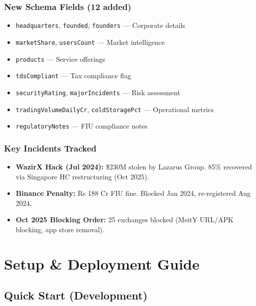 \documentclass[12pt,a4paper]{article}
\begin{document}
\subsubsection*{New Schema Fields (12 added)}
\begin{itemize}[nosep]
    \item \texttt{headquarters}, \texttt{founded}, \texttt{founders} — Corporate details
    \item \texttt{marketShare}, \texttt{usersCount} — Market intelligence
    \item \texttt{products} — Service offerings
    \item \texttt{tdsCompliant} — Tax compliance flag
    \item \texttt{securityRating}, \texttt{majorIncidents} — Risk assessment
    \item \texttt{tradingVolumeDailyCr}, \texttt{coldStoragePct} — Operational metrics
    \item \texttt{regulatoryNotes} — FIU compliance notes
\end{itemize}

\subsubsection*{Key Incidents Tracked}
\begin{itemize}[nosep]
    \item \textbf{WazirX Hack (Jul 2024):} \$230M stolen by Lazarus Group. 85\% recovered via Singapore HC restructuring (Oct 2025).
    \item \textbf{Binance Penalty:} Rs 188 Cr FIU fine. Blocked Jan 2024, re-registered Aug 2024.
    \item \textbf{Oct 2025 Blocking Order:} 25 exchanges blocked (MeitY URL/APK blocking, app store removal).
\end{itemize}

\newpage

\section{Setup \& Deployment Guide}

\subsection{Quick Start (Development)}
\end{document}
